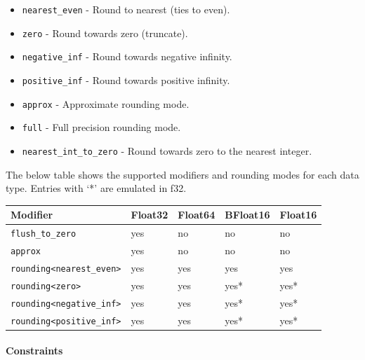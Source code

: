\documentclass{article}
\begin{document}
\begin{itemize}
\item \texttt{nearest\_even} - Round to nearest (ties to even).
\item \texttt{zero} - Round towards zero (truncate).
\item \texttt{negative\_inf} - Round towards negative infinity.
\item \texttt{positive\_inf} - Round towards positive infinity.
\item \texttt{approx} - Approximate rounding mode.
\item \texttt{full} - Full precision rounding mode.
\item \texttt{nearest\_int\_to\_zero} - Round towards zero to the nearest integer.

\end{itemize}
The below table shows the supported modifiers and rounding modes for each data type. Entries with `*' are emulated in f32.


\begin{longtable}{l|l|l|l|l}
\hline
Modifier & Float32 & Float64 & BFloat16 & Float16 \\ \hline
\texttt{flush\_to\_zero} & yes & no & no & no \\ \hline
\texttt{approx} & yes & no & no & no \\ \hline
\texttt{rounding<nearest\_even>} & yes & yes & yes & yes \\ \hline
\texttt{rounding<zero>} & yes & yes & yes* & yes* \\ \hline
\texttt{rounding<negative\_inf>} & yes & yes & yes* & yes* \\ \hline
\texttt{rounding<positive\_inf>} & yes & yes & yes* & yes* \\ \hline
\end{longtable}


\paragraph{Constraints}
\end{document}
